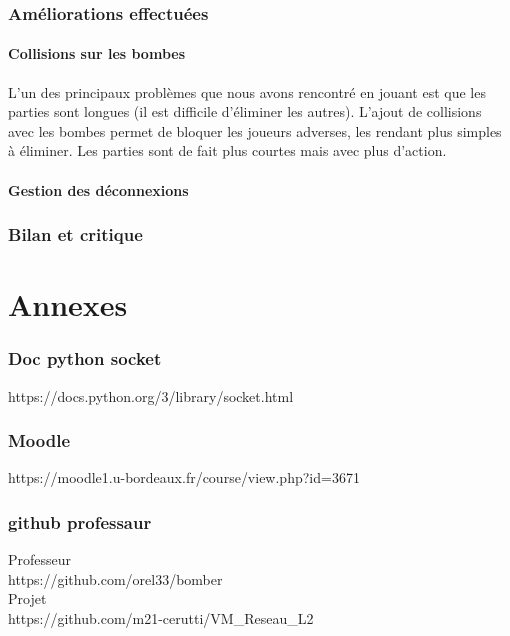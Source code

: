 \documentclass[a4paper]{article}
\begin{document}
	\section{Améliorations effectuées}
		\subsection{Collisions sur les bombes}
		L'un des principaux problèmes que nous avons rencontré en jouant est que les parties sont longues (il est difficile d'éliminer les autres).
		L'ajout de collisions avec les bombes permet de bloquer les joueurs adverses, les rendant plus simples à éliminer.
		Les parties sont de fait plus courtes mais avec plus d'action.

		\subsection{Gestion des déconnexions}

	\section{Bilan et critique}

\newpage
\appendix
\part{Annexes}

\section{Doc python socket} \label{docpysoc}

https://docs.python.org/3/library/socket.html

\section{Moodle} \label{moodle}

https://moodle1.u-bordeaux.fr/course/view.php?id=3671

\section{github professaur} \label{github}

Professeur
\\
https://github.com/orel33/bomber
\\

Projet
\\
https://github.com/m21-cerutti/VM\_Reseau\_L2
\\
\end{document}
